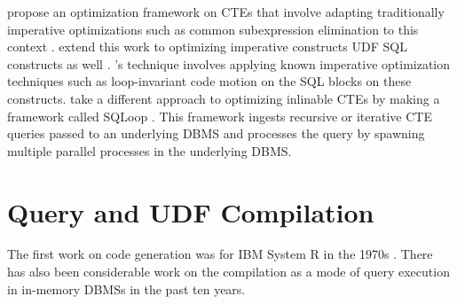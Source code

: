 \documentclass[12pt]{cmuthesis}
\begin{document}
        \citeauthor{elhelw15} propose an optimization framework on CTEs that involve adapting traditionally imperative optimizations such as common subexpression elimination to this context \cite{elhelw15}. \citeauthor{Park19} extend this work to optimizing imperative constructs UDF SQL constructs as well \cite{Park19}. \citeauthor{Park19}'s technique involves applying known imperative optimization techniques such as loop-invariant code motion on the SQL blocks on these constructs. \citeauthor{floratos18} take a different approach to optimizing inlinable CTEs by making a framework called SQLoop \cite{floratos18}. This framework ingests recursive or iterative CTE queries passed to an underlying DBMS and processes the query by spawning multiple parallel processes in the underlying DBMS.
        
        \section{Query and UDF Compilation}
        The first work on code generation was for IBM System R in the 1970s \cite{chamberlin81}. There has also been considerable work on the compilation as a mode of query execution in in-memory DBMSs in the past ten years.\\
        
\end{document}
